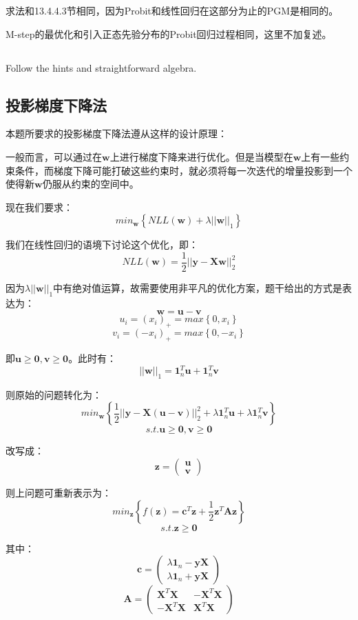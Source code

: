 \documentclass[UTF8]{ctexart}
\begin{document}
求法和13.4.4.3节相同，因为Probit和线性回归在这部分为止的PGM是相同的。

M-step的最优化和引入正态先验分布的Probit回归过程相同，这里不加复述。

\subsection{}
Follow the hints and straightforward algebra.

\subsection{投影梯度下降法}
本题所要求的投影梯度下降法遵从这样的设计原理：

一般而言，可以通过在$\textbf{w}$上进行梯度下降来进行优化。但是当模型在$\textbf{w}$上有一些约束条件，而梯度下降可能打破这些约束时，就必须将每一次迭代的增量投影到一个使得新$\textbf{w}$仍服从约束的空间中。

现在我们要求：
$$min_{\textbf{w}}\left\{ NLL(\textbf{w}) +\lambda||\textbf{w}||_{1}\right\}$$

我们在线性回归的语境下讨论这个优化，即：
$$NLL(\textbf{w})=\frac{1}{2}||\textbf{y}-\textbf{X}\textbf{w}||^{2}_{2}$$

因为$\lambda||\textbf{w}||_{1}$中有绝对值运算，故需要使用非平凡的优化方案，题干给出的方式是表达为：
$$\textbf{w}=\textbf{u}-\textbf{v}$$
$$u_{i}=(x_{i})_{+}=max \left\{ 0,x_{i} \right\}$$
$$v_{i}=(-x_{i})_{+}=max \left\{ 0,-x_{i} \right\}$$

即$\textbf{u} \geq \textbf{0},\textbf{v} \geq \textbf{0}$。此时有：
$$||\textbf{w}||_{1} = \textbf{1}_{n}^{T}\textbf{u} + \textbf{1}_{n}^{T}\textbf{v}$$

则原始的问题转化为：
$$min_{\textbf{w}}\left\{ \frac{1}{2}||\textbf{y}-\textbf{X}(\textbf{u}-\textbf{v})||^{2}_{2} + \lambda\textbf{1}_{n}^{T}\textbf{u} + \lambda\textbf{1}_{n}^{T}\textbf{v} \right\}$$
$$s.t.\textbf{u} \geq \textbf{0},\textbf{v} \geq \textbf{0}$$

改写成：
$$\textbf{z} = \begin{pmatrix}  \textbf{u} \\ \textbf{v} \end{pmatrix}$$

则上问题可重新表示为：
$$min_{\textbf{z}}\left\{ f(\textbf{z}) = \textbf{c}^{T}\textbf{z} +\frac{1}{2}\textbf{z}^{T}\textbf{A}\textbf{z} \right\}$$
$$s.t.\textbf{z} \geq \textbf{0}$$

其中：
$$\textbf{c} = \begin{pmatrix} \lambda \textbf{1}_{n} - \textbf{y}\textbf{X} \\ \lambda\textbf{1}_{n} + \textbf{y}\textbf{X} \end{pmatrix}$$
$$\textbf{A}=\begin{pmatrix} \textbf{X}^{T}\textbf{X} & -\textbf{X}^{T}\textbf{X} \\ -\textbf{X}^{T}\textbf{X} & \textbf{X}^{T}\textbf{X} \end{pmatrix}$$
\end{document}
